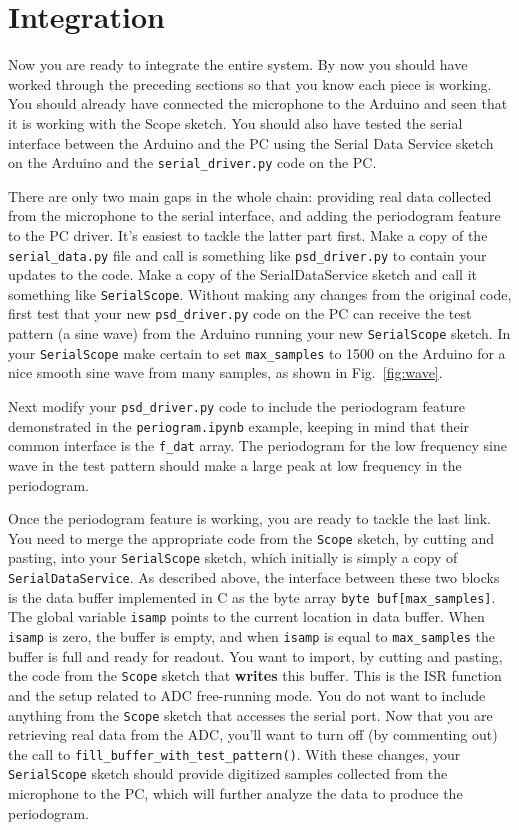 \documentclass[12pt]{article}
\begin{document}
\section{Integration}

Now you are ready to integrate the entire system.  By now you should have worked through the preceding sections so that you know each piece is working.  You should already have connected the microphone to the Arduino and seen that it is working with the Scope sketch.  You should also have tested the serial interface between the Arduino and the PC using the Serial Data Service sketch on the Arduino and the {\tt serial\_driver.py} code on the PC. 

There are only two main gaps in the whole chain: providing real data collected from the microphone to the serial interface, and adding the periodogram feature to the PC driver.  It's easiest to tackle the latter part first.  Make a copy of the {\tt serial\_data.py} file and call is something like {\tt psd\_driver.py} to contain your updates to the code.   Make a copy of the SerialDataService sketch and call it something like {\tt SerialScope}.  Without making any changes from the original code, first test that your new {\tt psd\_driver.py} code on the PC can receive the test pattern (a sine wave) from the Arduino running your new {\tt SerialScope} sketch.  In your {\tt SerialScope} make certain to set {\tt max\_samples} to 1500 on the Arduino for a nice smooth sine wave from many samples, as shown in Fig.~\ref{fig:wave}. 

 Next modify your {\tt psd\_driver.py} code to include the periodogram feature demonstrated in the {\tt periogram.ipynb} example, keeping in mind that their common interface is the {\tt f\_dat} array.  The periodogram for the low frequency sine wave in the test pattern should make a large peak at low frequency in the periodogram.
 
Once the periodogram feature is working, you are ready to tackle the last link.   You need to merge the appropriate code from the {\tt Scope} sketch, by cutting and pasting, into your {\tt SerialScope} sketch, which initially is simply a copy of {\tt SerialDataService}.  As described above, the interface between these two blocks is the data buffer implemented in C as the byte array {\tt byte buf[max\_samples]}.  The global variable {\tt isamp} points to the current location in data buffer.  When {\tt isamp} is zero, the buffer is empty, and when {\tt isamp} is equal to {\tt max\_samples}  the buffer is full and ready for readout.
You want to import, by cutting and pasting, the code from the {\tt Scope} sketch that {\bf writes} this buffer.  This is the ISR function and the setup related to ADC free-running mode.  You do not want to include anything from the {\tt Scope} sketch that accesses the serial port.  Now that you are retrieving real data from the ADC, you'll want to turn off (by commenting out) the call to {\tt fill\_buffer\_with\_test\_pattern()}.
With these changes, your {\tt SerialScope} sketch should provide digitized samples collected from the microphone to the PC, which will further analyze the data to produce the periodogram.
\end{document}
